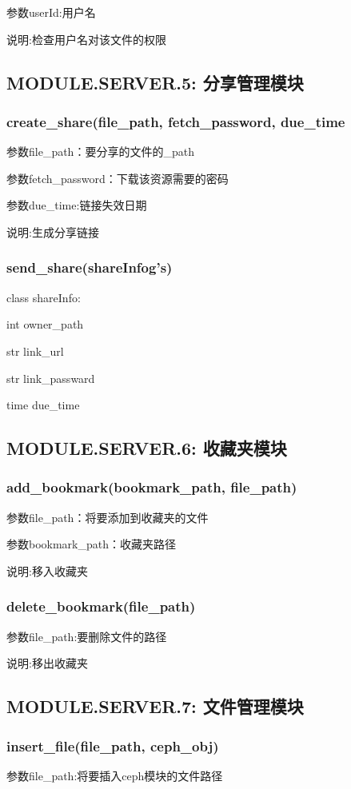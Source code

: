参数userId:用户名

说明:检查用户名对该文件的权限

\subsection{MODULE.SERVER.5: 分享管理模块}
\subsubsection{create\_share(file\_path, fetch\_password, due\_time}
参数file\_path：要分享的文件的\_path

参数fetch\_password：下载该资源需要的密码

参数due\_time:链接失效日期

说明:生成分享链接

\subsubsection{send\_share(shareInfog's)}
class shareInfo:

    int owner\_path

    str link\_url

    str link\_passward

    time due\_time

\subsection{MODULE.SERVER.6: 收藏夹模块}

\subsubsection{add\_bookmark(bookmark\_path, file\_path)}
参数file\_path：将要添加到收藏夹的文件

参数bookmark\_path：收藏夹路径

说明:移入收藏夹
\subsubsection{delete\_bookmark(file\_path)}
参数file\_path:要删除文件的路径
 
说明:移出收藏夹
\subsection{MODULE.SERVER.7: 文件管理模块}

\subsubsection{insert\_file(file\_path, ceph\_obj)}
参数file\_path:将要插入ceph模块的文件路径

